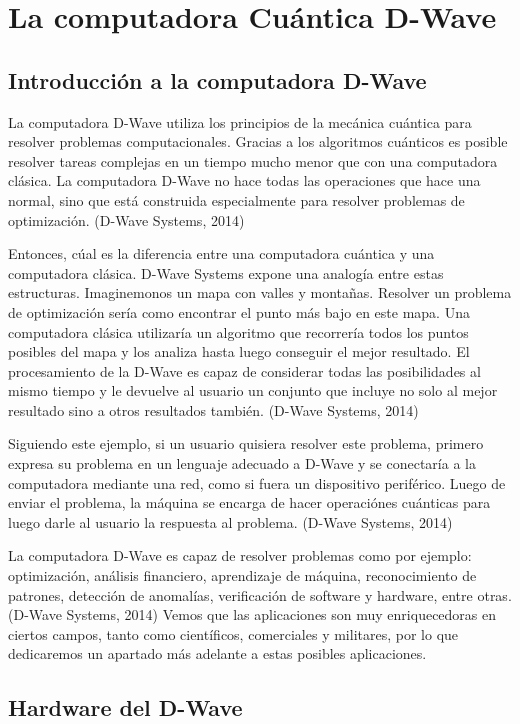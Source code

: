 \documentclass[11pt,a4paper]{article}
\begin{document}
\section*{La computadora Cuántica D-Wave}
\subsection*{Introducción a la computadora D-Wave}

La computadora D-Wave utiliza los principios de la mecánica cuántica para resolver problemas computacionales. Gracias a los algoritmos cuánticos es posible resolver tareas complejas en un tiempo mucho menor que con una computadora clásica. La computadora D-Wave no hace todas las operaciones que hace una normal, sino que está construida especialmente para resolver problemas de optimización. (D-Wave Systems, 2014)

Entonces, cúal es la diferencia entre una computadora cuántica y una computadora clásica. D-Wave Systems expone una analogía entre estas estructuras. Imaginemonos un mapa con valles y montañas. Resolver un problema de optimización sería como encontrar el punto más bajo en este mapa. Una computadora clásica utilizaría un algoritmo que recorrería todos los puntos posibles del mapa y los analiza hasta luego conseguir el mejor resultado. El procesamiento de la D-Wave es capaz de considerar todas las posibilidades al mismo tiempo y le devuelve al usuario un conjunto que incluye no solo al mejor resultado sino a otros resultados también. (D-Wave Systems, 2014)

Siguiendo este ejemplo, si un usuario quisiera resolver este problema, primero expresa su problema en un lenguaje adecuado a D-Wave y se conectaría a la computadora mediante una red, como si fuera un dispositivo periférico. Luego de enviar el problema, la máquina se encarga de hacer operaciónes cuánticas para luego darle al usuario la respuesta al problema.  (D-Wave Systems, 2014)

La computadora D-Wave es capaz de resolver problemas como por ejemplo: optimización, análisis financiero, aprendizaje de máquina, reconocimiento de patrones, detección de anomalías, verificación de software y hardware, entre otras. (D-Wave Systems, 2014) Vemos que las aplicaciones son muy enriquecedoras en ciertos campos, tanto como científicos, comerciales y militares, por lo que dedicaremos un apartado más adelante a estas posibles aplicaciones.

\subsection*{Hardware del D-Wave}
\end{document}
